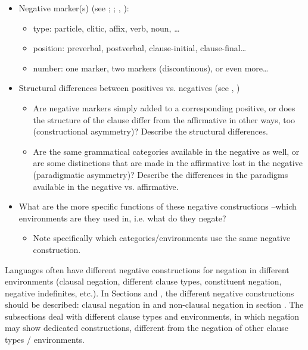 \documentclass[output=paper,colorlinks,citecolor=brown]{langscibook}
\begin{document}
\begin{itemize}
    \item Negative marker(s) (see \citealt{Dahl1979}; \citealt{Payne1985}; \citealt{Dryer2005-wals112}, \citeyear{Dryer2011-wals143,Dryer2011-wals144}): 
    \begin{itemize}
        \item type: particle, clitic, affix, verb, noun, … 
        \item position: preverbal, postverbal, clause-initial, clause-final…
        \item number: one marker, two markers (discontinous), or even more…
    \end{itemize}
    \item Structural differences between positives vs. negatives (see \citealt[51ff]{Miestamo2005}, \citeyear{Miestamo2007,Miestamo2017})
    \begin{itemize}
        \item Are negative markers simply added to a corresponding positive, or does the structure of the clause differ from the affirmative in other ways, too (constructional asymmetry)? Describe the structural differences.
        \item Are the same grammatical categories available in the negative as well, or are some distinctions that are made in the affirmative lost in the negative (paradigmatic asymmetry)? Describe the differences in the paradigms available in the negative vs. affirmative.
    \end{itemize}
    \item What are the more specific functions of these negative constructions –which environments are they used in, i.e. what do they negate?
    \begin{itemize}
        \item Note specifically which categories/environments use the same negative construction.
    \end{itemize}
\end{itemize}

Languages often have different negative constructions for negation in different environments (clausal negation, different clause types, constituent negation, negative indefinites, etc.). In Sections  and , the different negative constructions should be described: clausal negation in  and non-clausal negation in section . The subsections deal with different clause types and environments, in which negation may show dedicated constructions, different from the negation of other clause types / environments. 
\end{document}
